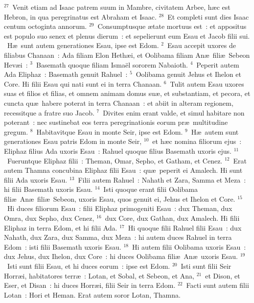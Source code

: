${}^{27}$~Venit etiam ad Isaac patrem suum in Mambre, civitatem Arbee, h\ae c est Hebron, in qua peregrinatus est Abraham et Isaac.
${}^{28}$~Et completi sunt dies Isaac centum octoginta annorum.
${}^{29}$~Consumptusque \ae tate mortuus est~: et appositus est populo suo senex et plenus dierum~: et sepelierunt eum Esau et Jacob filii sui.
~H\ae\ sunt autem generationes Esau, ipse est Edom.
${}^{2}$~Esau accepit uxores de filiabus Chanaan~: Ada filiam Elon Heth\ae i, et Oolibama filiam An\ae\ fili\ae\ Sebeon Hev\ae i~:
${}^{3}$~Basemath quoque filiam Isma\"el sororem Nabaioth.
${}^{4}$~Peperit autem Ada Eliphaz~: Basemath genuit Rahuel~:
${}^{5}$~Oolibama genuit Jehus et Ihelon et Core. Hi filii Esau qui nati sunt ei in terra Chanaan.
${}^{6}$~Tulit autem Esau uxores suas et filios et filias, et omnem animam domus su\ae , et substantiam, et pecora, et cuncta qu\ae\ habere poterat in terra Chanaan~: et abiit in alteram regionem, recessitque a fratre suo Jacob.
${}^{7}$~Divites enim erant valde, et simul habitare non poterant~: nec sustinebat eos terra peregrinationis eorum pr\ae\ multitudine gregum.
${}^{8}$~Habitavitque Esau in monte Seir, ipse est Edom.
${}^{9}$~H\ae\ autem sunt generationes Esau patris Edom in monte Seir,
${}^{10}$~et h\ae c nomina filiorum ejus~: Eliphaz filius Ada uxoris Esau~: Rahuel quoque filius Basemath uxoris ejus.
${}^{11}$~Fueruntque Eliphaz filii~: Theman, Omar, Sepho, et Gatham, et Cenez.
${}^{12}$~Erat autem Thamna concubina Eliphaz filii Esau~: qu\ae\ peperit ei Amalech. Hi sunt filii Ada uxoris Esau.
${}^{13}$~Filii autem Rahuel~: Nahath et Zara, Samma et Meza~: hi filii Basemath uxoris Esau.
${}^{14}$~Isti quoque erant filii Oolibama fili\ae\ An\ae\ fili\ae\ Sebeon, uxoris Esau, quos genuit ei, Jehus et Ihelon et Core.
${}^{15}$~Hi duces filiorum Esau~: filii Eliphaz primogeniti Esau~: dux Theman, dux Omra, dux Sepho, dux Cenez,
${}^{16}$~dux Core, dux Gathan, dux Amalech. Hi filii Eliphaz in terra Edom, et hi filii Ada.
${}^{17}$~Hi quoque filii Rahuel filii Esau~: dux Nahath, dux Zara, dux Samma, dux Meza~: hi autem duces Rahuel in terra Edom~: isti filii Basemath uxoris Esau.
${}^{18}$~Hi autem filii Oolibama uxoris Esau~: dux Jehus, dux Ihelon, dux Core~: hi duces Oolibama fili\ae\ An\ae\ uxoris Esau.
${}^{19}$~Isti sunt filii Esau, et hi duces eorum~: ipse est Edom.
${}^{20}$~Isti sunt filii Seir Horr\ae i, habitatores terr\ae~: Lotan, et Sobal, et Sebeon, et Ana,
${}^{21}$~et Dison, et Eser, et Disan~: hi duces Horr\ae i, filii Seir in terra Edom.
${}^{22}$~Facti sunt autem filii Lotan~: Hori et Heman. Erat autem soror Lotan, Thamna.
